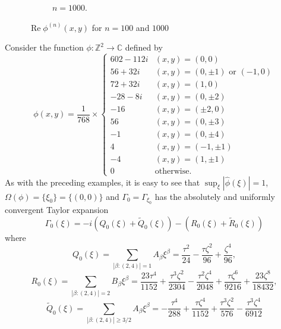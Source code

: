 \documentclass[11pt]{article}
\newenvironment{example}
  {\pushQED{\qed}\renewcommand{\qedsymbol}{$\triangle$}\examplex}
  {\popQED\endexamplex}
\theoremstyle{remark}
\renewcommand\Re{\operatorname{Re}}%
\newcommand{\f}[2]{\frac{#1}{#2}}
\begin{document}
\begin{example}
\begin{figure}[!htb]
\begin{subfigure}{0.49\textwidth}
    \caption{$n = 1000$.}
    \label{fig:Conv_Pwr_00b}
    \end{subfigure}
    \caption{$\Re\phi^{(n)}(x,y)$ for $n=100$ and $1000$}
    \label{fig:Conv_Pwr_00}
\end{figure}
\end{example}

\begin{example}\normalfont
Consider the function $\phi : \mathbb{Z}^2 \to \mathbb{C}$ defined by 
\begin{equation*}
    \phi(x,y) = 
    \f{1}{768}\times
    \begin{cases}
    602 - 112i &(x,y) = (0,0)\\
    56 + 32i   &(x,y) = (0,\pm 1)\mbox{ or }(-1,0)\\
    72 + 32i   &(x,y) = (1,0)\\
    -28 - 8i   &(x,y) = (0,\pm 2)\\
    -16        &(x,y) = (\pm 2,0)\\
    56         &(x,y) = (0,\pm 3)\\
    -1         &(x,y) = (0,\pm 4)\\
    4          &(x,y) = (-1,\pm 1)\\
    -4         &(x,y) = (1,\pm 1)\\
    0          &\text{otherwise}.
    \end{cases}
\end{equation*}
As with the preceding examples, it is easy to see that $\sup_{\xi}|\widehat{\phi}(\xi)|=1$, $\Omega(\phi)=\{\xi_0\}=\{(0,0)\}$ and $\Gamma_{0}=\Gamma_{\xi_0}$ has the absolutely and uniformly convergent Taylor expansion
\begin{equation*}
    \Gamma_{0}(\xi)=-i\left(Q_0(\xi)+\widetilde{Q}_0(\xi)\right)-\left(R_0(\xi)+\widetilde{R}_0(\xi)\right)
\end{equation*}
where
\begin{equation*}
    Q_0(\xi)=\sum_{|\beta:(2,4)|=1}A_\beta \xi^\beta=\frac{\tau^2}{24}-\frac{\tau\zeta^2}{96} +\frac{ \zeta^4}{96},
\end{equation*}
\begin{equation*}
    R_0(\xi)=\sum_{|\beta:(2,4)|=2}B_\beta \xi^\beta=\frac{23\tau^4}{1152}  + \frac{\tau^3\zeta^2}{2304}  - \frac{\tau^2\zeta^4}{2048} + \f{\tau\zeta^6}{9216}+ \frac{23\zeta^8}{18432},
\end{equation*}
\begin{equation*}
    \widetilde{Q}_0(\xi)=\sum_{|\beta:(2,4)|\geq 3/2}A_\beta \xi^\beta=- \frac{\tau^4}{288}+\frac{\tau\zeta^4}{1152} +\frac{\tau^3\zeta^2}{576}  -\frac{\tau^3\zeta^4}{6912} %

\end{equation*}
\end{example}
\end{document}

